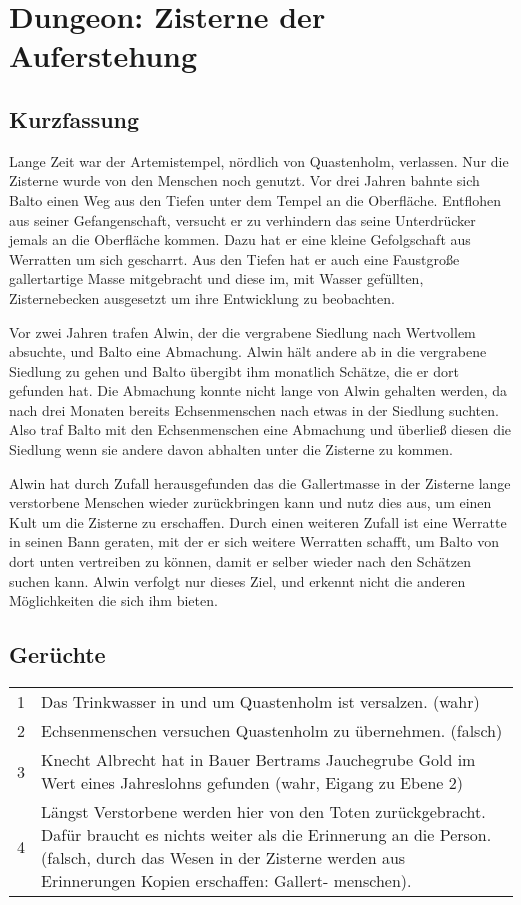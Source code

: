 \section{Dungeon: Zisterne der Auferstehung}

\subsection{Kurzfassung}

Lange Zeit war der Artemistempel, nördlich von Quastenholm, verlassen. Nur die
Zisterne wurde von den Menschen noch genutzt. Vor drei Jahren bahnte sich Balto
einen Weg aus den Tiefen unter dem Tempel an die Oberfläche. Entflohen aus
seiner Gefangenschaft, versucht er zu verhindern das seine Unterdrücker jemals
an die Oberfläche kommen. Dazu hat er eine kleine Gefolgschaft aus
Werratten um sich gescharrt. Aus den Tiefen hat er auch eine Faustgroße
gallertartige Masse mitgebracht und diese im, mit Wasser gefüllten,
Zisternebecken ausgesetzt um ihre Entwicklung zu beobachten.

Vor zwei Jahren trafen Alwin, der die vergrabene Siedlung nach Wertvollem
absuchte, und Balto eine Abmachung. Alwin hält andere ab in die vergrabene
Siedlung zu gehen und Balto übergibt ihm monatlich Schätze, die er dort
gefunden hat. Die Abmachung konnte nicht lange von Alwin gehalten werden, da
nach drei Monaten bereits Echsenmenschen nach etwas in der Siedlung suchten. Also
traf Balto mit den Echsenmenschen eine Abmachung und überließ diesen die
Siedlung wenn sie andere davon abhalten unter die Zisterne zu kommen.

Alwin hat durch Zufall herausgefunden das die Gallertmasse in der
Zisterne lange verstorbene Menschen wieder zurückbringen kann und
nutz dies aus, um einen Kult um die Zisterne zu erschaffen. Durch
einen weiteren Zufall ist eine Werratte in seinen Bann geraten, mit
der er sich weitere Werratten schafft, um Balto von dort unten
vertreiben zu können, damit er selber wieder nach den Schätzen suchen
kann. Alwin verfolgt nur dieses Ziel, und erkennt nicht die
anderen Möglichkeiten die sich ihm bieten.

\subsection{Gerüchte}

\begin{tabularx}{\columnwidth}{cZ}
1 & Das Trinkwasser in und um Quastenholm ist versalzen. (wahr) \\
2 & Echsenmenschen versuchen Quastenholm zu übernehmen. (falsch) \\
3 & Knecht Albrecht hat in Bauer Bertrams Jauchegrube Gold im Wert eines
    Jahreslohns gefunden (wahr, Eigang zu Ebene 2) \\
4 & Längst Verstorbene werden hier von den Toten zurückgebracht.
    Dafür braucht es nichts weiter als die Erinnerung an die Person.
    (falsch, durch das Wesen in der Zisterne werden aus Erinnerungen Kopien 
    erschaffen: Gallert- menschen). \\
\end{tabularx}


